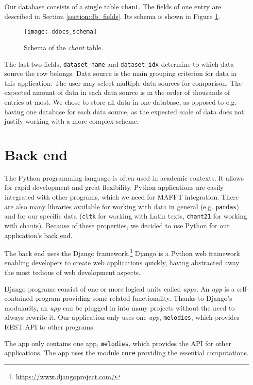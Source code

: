 Our database consists of a single table \verb|chant|. The fields of one entry are described in Section \ref{section:db_fields}. Its schema is shown
in Figure \ref{fig:schema}.

\begin{figure}[!h]
\centering
\texttt{[image: ddocs\_schema]}
\caption{Schema of the \emph{chant} table.}
\label{fig:schema}
\end{figure}

The last two fields, \verb|dataset_name| and \verb|dataset_idx| determine to which data source the row belongs. Data source is the main grouping criterion
for data in this application. The user may select multiple data sources for comparison. The expected amount of data in each data source is in the order
of thousands of entries at most. We chose to store all data in one database, as opposed to e.g. having one database for each data source, as the expected
scale of data does not justify working with a more complex scheme.

\section{Back end}

The Python programming language is often used in academic contexts. It allows for rapid development and great flexibility. Python applications are easily
integrated with other programs, which we need for MAFFT integration. There are also many libraries available for working with data in general (e.g. \verb|pandas|)
and for our specific data (\verb|cltk| for working with Latin texts, \verb|chant21| for working with chants). Because of these properties, we decided to use Python
for our application's back end.

The back end uses the Django framework.\footnote{\url{https://www.djangoproject.com/}} Django is a Python web framework enabling developers to create web
applications quickly, having abstracted away the most tedious of web development aspects.

Django programs consist of one or more logical units called \emph{apps}. An \emph{app} is a self-contained program providing some related functionality. Thanks
to Django's modularity, an \emph{app} can be plugged in into many projects without the need to always rewrite it. Our application only uses one \emph{app},
\verb|melodies|, which provides REST API to other programs.

The app only contains one app, \verb|melodies|, which provides the API for other applications. The app uses the module \verb|core| providing the essential
computations.

